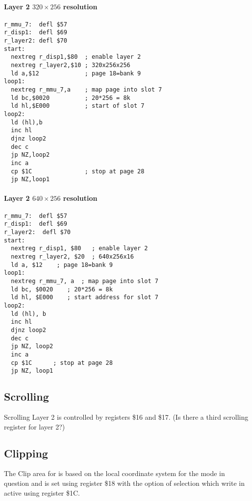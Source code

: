 \paragraph{Layer 2 $320\times256$ resolution}
\begin{verbatim}
r_mmu_7:  defl $57
r_disp1:  defl $69
r_layer2: defl $70
start:
  nextreg r_disp1,$80  ; enable layer 2
  nextreg r_layer2,$10 ; 320x256x256
  ld a,$12             ; page 18=bank 9
loop1:
  nextreg r_mmu_7,a    ; map page into slot 7
  ld bc,$0020          ; 20*256 = 8k
  ld hl,$E000          ; start of slot 7
loop2:
  ld (hl),b
  inc hl
  djnz loop2
  dec c
  jp NZ,loop2
  inc a
  cp $1C               ; stop at page 28
  jp NZ,loop1
\end{verbatim}
\paragraph{Layer 2 $640\times256$ resolution}
\begin{verbatim}
r_mmu_7:  defl $57
r_disp1:  defl $69
r_layer2:  defl $70
start:
  nextreg r_disp1, $80   ; enable layer 2
  nextreg r_layer2, $20  ; 640x256x16
  ld a, $12    ; page 18=bank 9
loop1:
  nextreg r_mmu_7, a  ; map page into slot 7
  ld bc, $0020    ; 20*256 = 8k
  ld hl, $E000    ; start address for slot 7
loop2:
  ld (hl), b
  inc hl
  djnz loop2
  dec c
  jp NZ, loop2
  inc a
  cp $1C      ; stop at page 28
  jp NZ, loop1
\end{verbatim}
\einset

\subsection{Scrolling}
Scrolling Layer 2 is controlled by registers \$16 and \$17. (Is there
a third scrolling register for layer 2?)




\subsection{Clipping}
The Clip area for is based on the local coordinate system for the mode
in question and is set using register \$18 with the option of
selection which write in active using register \$1C.



